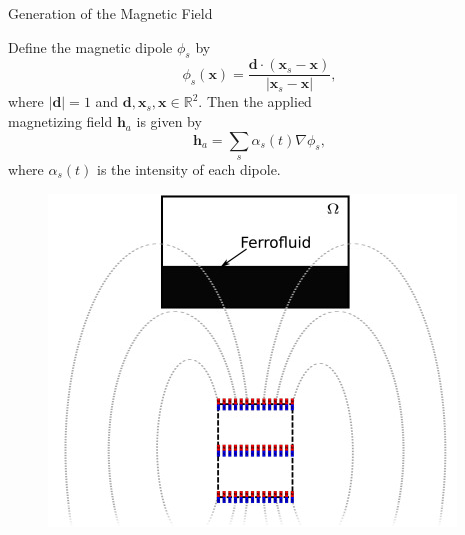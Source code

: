\documentclass[9pt]{beamer}
\newcommand{\Real}{\mathbb R}
\newcommand{\abs}[1]{\left\vert#1\right\vert}
\newcommand{\grad}{\nabla}
\begin{document}
\begin{frame}{Generation of the Magnetic Field}
	\begin{minipage}{.6\paperwidth}
		Define the magnetic dipole $\phi_s$ by
		$$
		\phi_s(\mathbf{x}) = \frac{\mathbf{d}\cdot(\mathbf{x}_s - \mathbf{x})}{\abs{\mathbf{x}_s - \mathbf{x}}}, 
		$$
		where $\abs{\mathbf{d}}=1$ and $\mathbf{d},\mathbf{x}_s,\mathbf{x}\in\Real^2$. Then the applied\\ magnetizing field $\mathbf{h}_a$ is given by
		$$
		\mathbf{h}_a = \sum_s \alpha_s(t) \grad\phi_s,
		$$
		where $\alpha_s(t)$ is the intensity of each dipole.
	\end{minipage}%
	\begin{minipage}{.3\paperwidth}
		\begin{figure}[!b]
			\centering
			\includegraphics[scale=.4]{MagField.jpg}
		\end{figure}
	\end{minipage}%
\end{frame}
\end{document}
